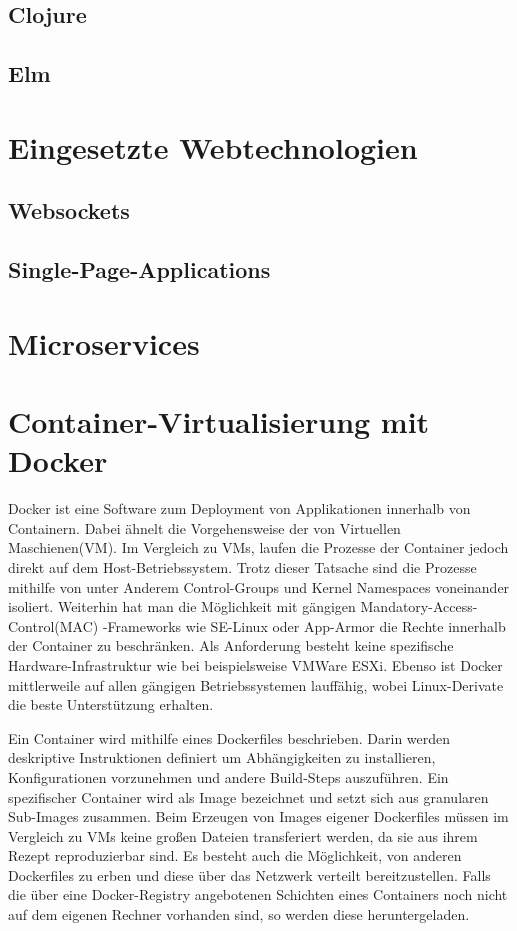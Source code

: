 \documentclass[10pt,a4paper]{report}
\begin{document}
  \subsection{Clojure}
  \subsection{Elm}
  \section{Eingesetzte Webtechnologien}
  \subsection{Websockets}
  \subsection{Single-Page-Applications}
  \section{Microservices}
  \section{Container-Virtualisierung mit Docker}
  Docker ist eine Software zum Deployment von Applikationen innerhalb von Containern.
  Dabei ähnelt die Vorgehensweise der von Virtuellen Maschienen(VM).
  Im Vergleich zu VMs, laufen die Prozesse der Container jedoch direkt auf dem Host-Betriebssystem.
  Trotz dieser Tatsache sind die Prozesse mithilfe von unter Anderem Control-Groups und Kernel Namespaces voneinander isoliert.
  Weiterhin hat man die Möglichkeit mit gängigen Mandatory-Access-Control(MAC) -Frameworks wie SE-Linux oder App-Armor die Rechte innerhalb der Container zu beschränken.
  Als Anforderung besteht keine spezifische Hardware-Infrastruktur wie bei beispielsweise VMWare ESXi.
  Ebenso ist Docker mittlerweile auf allen gängigen Betriebssystemen lauffähig, wobei Linux-Derivate die beste Unterstützung erhalten.
  \par
  Ein Container wird mithilfe eines Dockerfiles beschrieben.
  Darin werden deskriptive Instruktionen definiert um Abhängigkeiten zu installieren, Konfigurationen vorzunehmen und andere Build-Steps auszuführen.
  Ein spezifischer Container wird als Image bezeichnet und setzt sich aus granularen Sub-Images zusammen.
  Beim Erzeugen von Images eigener Dockerfiles müssen im Vergleich zu VMs keine großen Dateien transferiert werden, da sie aus ihrem Rezept reproduzierbar sind. 
  Es besteht auch die Möglichkeit, von anderen Dockerfiles zu erben und diese über das Netzwerk verteilt bereitzustellen.
  Falls die über eine Docker-Registry angebotenen Schichten eines Containers noch nicht auf dem eigenen Rechner vorhanden sind, so werden diese heruntergeladen.
\end{document}
